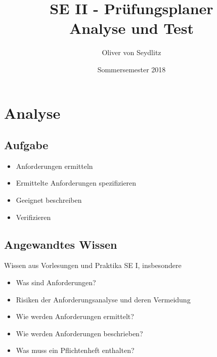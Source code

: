 \documentclass{beamer}
\title{SE II - Prüfungsplaner \\ Analyse und Test}
\author{Oliver von Seydlitz}
\date{Sommersemester 2018}
\begin{document}
  \maketitle

  \section{Analyse}
  \subsection{Aufgabe}
  \begin{frame}{\subsecname}
    \begin{itemize}
      \item Anforderungen ermitteln
      \item Ermittelte Anforderungen spezifizieren
      \item Geeignet beschreiben
      \item Verifizieren
    \end{itemize}
  \end{frame}

  \subsection{Angewandtes Wissen}
  \begin{frame}{\subsecname}
    Wissen aus Vorlesungen und Praktika SE I, insbesondere
    \begin{itemize}
      \item Was sind Anforderungen?
      \item Risiken der Anforderungsanalyse und deren Vermeidung
      \item Wie werden Anforderungen ermittelt?
      \item Wie werden Anforderungen beschrieben?
      \item Was muss ein Pflichtenheft enthalten?
    \end{itemize}
  \end{frame}
\end{document}
